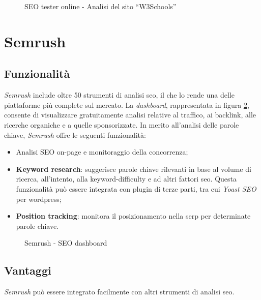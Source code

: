 \begin{figure}[H]
    \centering 
    \caption{SEO tester online - Analisi del sito “W3Schools”}
    \label{fig:seo_tester_online_w3schools}
\end{figure}

\section{Semrush}

\subsection{Funzionalità}
\textit{Semrush} include oltre 50 strumenti di analisi \gls{seo}, il che lo rende una delle piattaforme più complete sul mercato. La \textit{dashboard}, rappresentata in figura \ref{fig:semrush}, consente di visualizzare gratuitamente analisi relative al traffico, ai \gls{backlink}, alle ricerche \gls{organiche} e a quelle \gls{sponsorizzate}. In merito all’analisi delle parole chiave, \textit{Semrush} offre le seguenti funzionalità:
\begin{itemize}
    \item Analisi SEO \gls{on-page} e monitoraggio della concorrenza;
    \item \textbf{Keyword research}: suggerisce parole chiave rilevanti in base al volume di ricerca, all'intento, alla \gls{keyword-difficulty} e ad altri fattori \gls{seo}. Questa funzionalità può essere integrata con plugin di terze parti, tra cui \textit{Yoast SEO} per \gls{wordpress};
    \item \textbf{Position tracking}: monitora il posizionamento nella \gls{serp} per determinate parole chiave.
\end{itemize}

\begin{figure}[H] 
    \centering 
    \caption{Semrush - SEO dashboard}
    \label{fig:semrush}
\end{figure}

\subsection{Vantaggi}
\textit{Semrush} può essere integrato facilmente con altri strumenti di analisi \gls{seo}.

